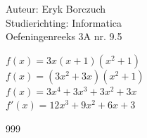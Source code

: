 \documentclass[a4paper]{article}
\begin{document}
  
\noindent \large Auteur: Eryk Borczuch \\
\noindent \large Studierichting: Informatica\\
\noindent \large Oefeningenreeks 3A nr. 9.5\\

\medskip

\normalsize

$f(x) = 3x(x+1) (x^2+1)$\\

$f(x) = (3x^2+3x)(x^2+1)$\\

$f(x) = 3x^4 + 3x^3 +3x^2 +3x$\\

$f'(x) = 12x^3 + 9x^2 +6x +3$\\

\begin{thebibliography}{999}
\end{thebibliography}
\end{document}
